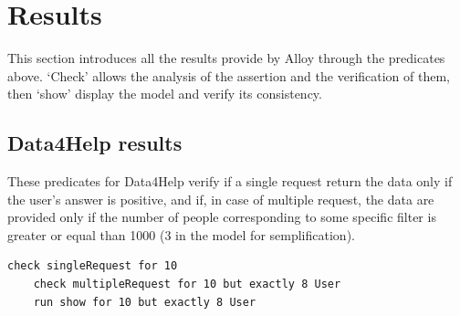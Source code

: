 \section{Results}

    This section introduces all the results provide by Alloy through the predicates above. `Check' allows the analysis of the assertion and the verification of them, then `show' display the model and verify its consistency.
    
    \subsection{Data4Help results}
    These predicates for Data4Help verify if a single request return the data only if the user's answer is positive, and if, in case of multiple request, the data are provided only if the number of people corresponding to some specific filter is greater or equal than 1000 (3 in the model for semplification).\\
  
\begin{lstlisting}[language=alloy]
    check singleRequest for 10
    check multipleRequest for 10 but exactly 8 User
    run show for 10 but exactly 8 User
\end{lstlisting}

    \begin{figure}[H]
        \centering
        \caption{ }
        \label{ fig:D4H-Results }
    \end{figure}
    
